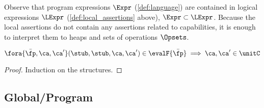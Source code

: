 
Observe that program expressions $\Expr$  (\ref{def:language}) are contained in logical expressions $\LExpr$ (\ref{def:local_assertions} above), \ie $\Expr \subset \LExpr$. 
Because the local assertions do not contain any assertions related to capabilities, it is enough to interpret them to heaps and sets of operations \( \Opsets \).

\begin{lem}
\(
    \fora{\bar{\fp},\ca,\ca'} (\stub, \stub, \ca, \ca') \in \evalF{\bar{\fp}} \implies \ca,\ca' \in \unitC
\)
\end{lem}
\begin{proof}
Induction on the structures.
\end{proof}


\subsection{Global/Program}



